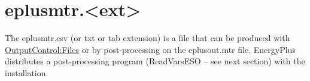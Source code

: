 \section{eplusmtr.\textless{}ext\textgreater{}}\label{eplusmtr.ext}

The eplusmtr.csv (or txt or tab extension) is a file that can be produced with \hyperref[outputcontrolfiles]{OutputControl:Files} or by post-processing on the eplusout.mtr file. EnergyPlus distributes a post-processing program (ReadVarsESO -- see next section) with the installation.

